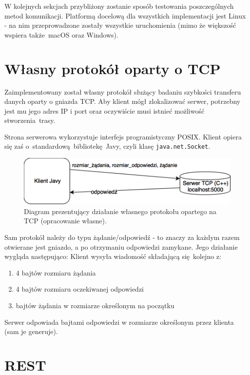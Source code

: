 W kolejnych sekcjach przybliżony zostanie sposób testowania poszczególnych metod komunikacji. Platformą docelową dla wszystkich implementacji jest Linux - na nim przeprowadzone zostały wszystkie uruchomienia (mimo że większość wspiera także macOS oraz Windows).

\section{Własny protokół oparty o TCP}

Zaimplementowany został własny protokół służący badaniu szybkości transferu danych oparty o gniazda TCP. Aby klient mógł zlokalizować serwer, potrzebny jest mu jego adres IP i port oraz oczywiście musi istnieć możliwość stworzenia trasy.

Strona serwerowa wykorzystuje interfejs programistyczny POSIX. Klient opiera się zaś o~standardową bibliotekę Javy, czyli klasę \texttt{java.net.Socket}.

\begin{figure}[h!]
    \centering
    \includegraphics[width=\textwidth,height=\textheight,keepaspectratio]{img/tcp_impl_diagram.png}
    \caption{Diagram prezentujący działanie własnego protokołu opartego na TCP (opracowanie własne).}
\end{figure}

Sam protokół należy do typu żądanie/odpowiedź - to znaczy za każdym razem otwierane jest gniazdo, a po otrzymaniu odpowiedzi zamykane. Jego działanie wygląda następująco:
\newline
Klient wysyła wiadomość składającą się kolejno z:
\begin{enumerate}
    \item 4 bajtów rozmiaru żądania
    \item 4 bajtów rozmiaru oczekiwanej odpowiedzi
    \item bajtów żądania w rozmiarze określonym na początku
\end{enumerate}
Serwer odpowiada bajtami odpowiedzi w rozmiarze określonym przez klienta (sam je generuje).


\section{REST}

